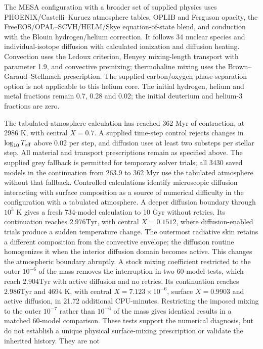 \documentclass[11pt,letterpaper]{article}
\newcommand{\Tyr}{\mathrm{Tyr}}
\begin{document}
The MESA configuration with a broader set of supplied physics uses
PHOENIX/Castelli--Kurucz atmosphere tables, OPLIB and Ferguson opacity,
the FreeEOS/OPAL--SCVH/HELM/Skye equation-of-state blend, and conduction
with the Blouin hydrogen/helium correction. It follows 34 nuclear species
and individual-isotope diffusion with calculated ionization and diffusion
heating. Convection uses the Ledoux criterion, Henyey mixing-length
transport with parameter 1.9, and convective premixing; thermohaline mixing
uses the Brown--Garaud--Stellmach prescription. The supplied
carbon/oxygen phase-separation option is not applicable to this helium core.
The initial hydrogen, helium and metal fractions remain 0.7, 0.28 and 0.02;
the initial deuterium and helium-3 fractions are zero.

The tabulated-atmosphere calculation has reached 362 Myr of
contraction, at 2986 K, with central $X=0.7$.
A supplied time-step control rejects changes in $\log_{10}T_{\rm eff}$
above 0.02 per step, and diffusion uses at least two substeps per stellar
step. All material and transport prescriptions remain as specified above.
The supplied grey fallback is permitted for temporary solver trials;
all 3430 saved models in the continuation from 263.9 to
362 Myr use the tabulated atmosphere without that fallback.
Controlled calculations identify microscopic diffusion interacting with
surface composition as a source of numerical difficulty in the
configuration with a tabulated atmosphere. A deeper diffusion boundary
through $10^5$ K gives a fresh 734-model calculation to 10 Gyr without
retries. Its continuation reaches $2.976\Tyr$, with central $X=0.1512$,
where diffusion-enabled trials produce a sudden temperature change.
The outermost radiative skin retains a different composition from the
convective envelope; the diffusion routine homogenizes it when the
interior diffusion domain becomes active. This changes the atmospheric
boundary abruptly. A stock mixing coefficient restricted to the outer
$10^{-6}$ of the mass removes the interruption in two 60-model tests,
which reach $2.904\Tyr$ with active diffusion and no retries. Its continuation
reaches $2.986\Tyr$ and 4694 K, with central $X=7.123\times10^{-6}$,
surface $X=0.9903$ and active diffusion, in 21.72 additional CPU-minutes.
Restricting the imposed mixing to the outer $10^{-7}$ rather than $10^{-6}$
of the mass gives identical results in a matched 60-model comparison.
These tests support the numerical diagnosis, but do not establish a unique
physical surface-mixing prescription or validate the inherited history. They are not
\end{document}
